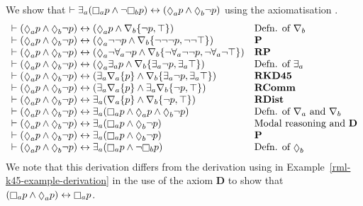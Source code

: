 \begin{example}\label{rml-kd45-example-derivation}
We show that $\proves \somerefsA (\necessaryA \atomP \land \lnot \necessaryB \atomP) \iff (\possibleA \atomP \land \possibleB \lnot \atomP)$ using the axiomatisation \axiomRmlKD{}.
$$
\begin{array}{ll}
    \proves (\possibleA \atomP \land \possibleB \lnot \atomP) \iff (\possibleA \atomP \land \coversB \{\lnot \atomP, \top\}) & \text{Defn. of $\coversB$}\\
    \proves (\possibleA \atomP \land \possibleB \lnot \atomP) \iff (\possibleA \lnot \lnot \atomP \land \coversB \{\lnot \lnot \lnot \atomP, \lnot \lnot \top\}) & {\bf P}\\
    \proves (\possibleA \atomP \land \possibleB \lnot \atomP) \iff (\possibleA \lnot \allrefsA \lnot \atomP \land \coversB \{\lnot \allrefsA \lnot \lnot \atomP, \lnot \allrefsA \lnot \top\}) & {\bf RP}\\
    \proves (\possibleA \atomP \land \possibleB \lnot \atomP) \iff (\possibleA \somerefsA \atomP \land \coversB \{\somerefsA \lnot \atomP, \somerefsA \top\}) & \text{Defn. of $\somerefsA$}\\
    \proves (\possibleA \atomP \land \possibleB \lnot \atomP) \iff (\somerefsA \coversA \{\atomP\} \land \coversB \{\somerefsA \lnot \atomP, \somerefsA \top\}) & {\bf RKD45}\\
    \proves (\possibleA \atomP \land \possibleB \lnot \atomP) \iff (\somerefsA \coversA \{\atomP\} \land \somerefsA \coversB \{\lnot \atomP, \top\}) & {\bf RComm}\\
    \proves (\possibleA \atomP \land \possibleB \lnot \atomP) \iff \somerefsA (\coversA \{\atomP\} \land \coversB \{\lnot \atomP, \top\}) & {\bf RDist}\\
    \proves (\possibleA \atomP \land \possibleB \lnot \atomP) \iff \somerefsA (\necessaryA \atomP \land \possibleA \atomP \land \possibleB \lnot \atomP) & \text{Defn. of $\coversA$ and $\coversB$}\\
    \proves (\possibleA \atomP \land \possibleB \lnot \atomP) \iff \somerefsA (\necessaryA \atomP \land \possibleB \lnot \atomP) & \text{Modal reasoning and {\bf D}}\\
    \proves (\possibleA \atomP \land \possibleB \lnot \atomP) \iff \somerefsA (\necessaryA \atomP \land \possibleB \lnot \atomP) & {\bf P}\\
    \proves (\possibleA \atomP \land \possibleB \lnot \atomP) \iff \somerefsA (\necessaryA \atomP \land \lnot \necessaryB \atomP) & \text{Defn. of $\possibleB$}
\end{array}
$$
We note that this derivation differs from the derivation using \axiomRmlKFF{} in Example~\ref{rml-k45-example-derivation} in the use of the axiom {\bf D} to show that $(\necessaryA \atomP \land \possibleA \atomP) \iff \necessaryA \atomP$.
\end{example}

